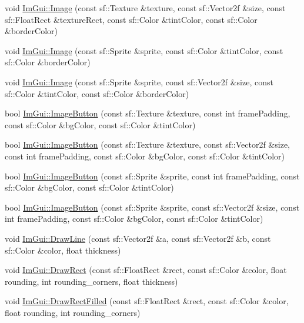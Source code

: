 \begin{DoxyCompactItemize}
\item 
void \mbox{\hyperlink{namespace_im_gui_a5a7a802b1e04f9fb07d7224b685f604e}{Im\+Gui\+::\+Image}} (const sf\+::\+Texture \&texture, const sf\+::\+Vector2f \&size, const sf\+::\+Float\+Rect \&texture\+Rect, const sf\+::\+Color \&tint\+Color, const sf\+::\+Color \&border\+Color)
\item 
void \mbox{\hyperlink{namespace_im_gui_a12ec1591629f9e4d845ca63501e3d577}{Im\+Gui\+::\+Image}} (const sf\+::\+Sprite \&sprite, const sf\+::\+Color \&tint\+Color, const sf\+::\+Color \&border\+Color)
\item 
void \mbox{\hyperlink{namespace_im_gui_ad852f4318abae0ec25a66620811eeb3a}{Im\+Gui\+::\+Image}} (const sf\+::\+Sprite \&sprite, const sf\+::\+Vector2f \&size, const sf\+::\+Color \&tint\+Color, const sf\+::\+Color \&border\+Color)
\item 
bool \mbox{\hyperlink{namespace_im_gui_ab30a68eecc7388f7708e87968445c414}{Im\+Gui\+::\+Image\+Button}} (const sf\+::\+Texture \&texture, const int frame\+Padding, const sf\+::\+Color \&bg\+Color, const sf\+::\+Color \&tint\+Color)
\item 
bool \mbox{\hyperlink{namespace_im_gui_a54dd41917603ec28ae8aa42625aecda0}{Im\+Gui\+::\+Image\+Button}} (const sf\+::\+Texture \&texture, const sf\+::\+Vector2f \&size, const int frame\+Padding, const sf\+::\+Color \&bg\+Color, const sf\+::\+Color \&tint\+Color)
\item 
bool \mbox{\hyperlink{namespace_im_gui_ae1ea307f7616cf2143040c02f40d676a}{Im\+Gui\+::\+Image\+Button}} (const sf\+::\+Sprite \&sprite, const int frame\+Padding, const sf\+::\+Color \&bg\+Color, const sf\+::\+Color \&tint\+Color)
\item 
bool \mbox{\hyperlink{namespace_im_gui_a37ef3e433d07343a693fde368fe68608}{Im\+Gui\+::\+Image\+Button}} (const sf\+::\+Sprite \&sprite, const sf\+::\+Vector2f \&size, const int frame\+Padding, const sf\+::\+Color \&bg\+Color, const sf\+::\+Color \&tint\+Color)
\item 
void \mbox{\hyperlink{namespace_im_gui_a9755035852a0a56e278947806b1ebed1}{Im\+Gui\+::\+Draw\+Line}} (const sf\+::\+Vector2f \&a, const sf\+::\+Vector2f \&b, const sf\+::\+Color \&color, float thickness)
\item 
void \mbox{\hyperlink{namespace_im_gui_abc7adec78c245a8f121051962d7dd434}{Im\+Gui\+::\+Draw\+Rect}} (const sf\+::\+Float\+Rect \&rect, const sf\+::\+Color \&color, float rounding, int rounding\+\_\+corners, float thickness)
\item 
void \mbox{\hyperlink{namespace_im_gui_a546d66f8477ae03b435b549891729701}{Im\+Gui\+::\+Draw\+Rect\+Filled}} (const sf\+::\+Float\+Rect \&rect, const sf\+::\+Color \&color, float rounding, int rounding\+\_\+corners)
\end{DoxyCompactItemize}
